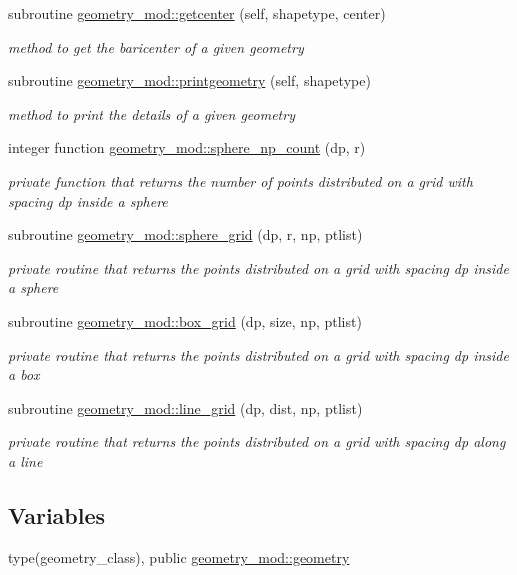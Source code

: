 \begin{DoxyCompactItemize}
subroutine \mbox{\hyperlink{namespacegeometry__mod_ab591f293deeeb5426b9f14865cc2df67}{geometry\+\_\+mod\+::getcenter}} (self, shapetype, center)
\begin{DoxyCompactList}\small\item\em method to get the baricenter of a given geometry \end{DoxyCompactList}\item 
subroutine \mbox{\hyperlink{namespacegeometry__mod_aed4426181ca851b41717edd50268e5f3}{geometry\+\_\+mod\+::printgeometry}} (self, shapetype)
\begin{DoxyCompactList}\small\item\em method to print the details of a given geometry \end{DoxyCompactList}\item 
integer function \mbox{\hyperlink{namespacegeometry__mod_a05de7940b4e7df5a2b31f3d0414e3743}{geometry\+\_\+mod\+::sphere\+\_\+np\+\_\+count}} (dp, r)
\begin{DoxyCompactList}\small\item\em private function that returns the number of points distributed on a grid with spacing dp inside a sphere \end{DoxyCompactList}\item 
subroutine \mbox{\hyperlink{namespacegeometry__mod_a6c03a4ea3de6763940396dbeb3908ebc}{geometry\+\_\+mod\+::sphere\+\_\+grid}} (dp, r, np, ptlist)
\begin{DoxyCompactList}\small\item\em private routine that returns the points distributed on a grid with spacing dp inside a sphere \end{DoxyCompactList}\item 
subroutine \mbox{\hyperlink{namespacegeometry__mod_ae87e4ecff2d21a839da2b82919b5fd0b}{geometry\+\_\+mod\+::box\+\_\+grid}} (dp, size, np, ptlist)
\begin{DoxyCompactList}\small\item\em private routine that returns the points distributed on a grid with spacing dp inside a box \end{DoxyCompactList}\item 
subroutine \mbox{\hyperlink{namespacegeometry__mod_abcb09c0f5274c27cb79b0dd009ed94b3}{geometry\+\_\+mod\+::line\+\_\+grid}} (dp, dist, np, ptlist)
\begin{DoxyCompactList}\small\item\em private routine that returns the points distributed on a grid with spacing dp along a line \end{DoxyCompactList}\end{DoxyCompactItemize}
\subsection*{Variables}
\begin{DoxyCompactItemize}
\item 
type(geometry\+\_\+class), public \mbox{\hyperlink{namespacegeometry__mod_ad2ad4f7e1138beaad5f37d5c15b7b457}{geometry\+\_\+mod\+::geometry}}
\end{DoxyCompactItemize}
